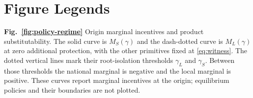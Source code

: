\section*{Figure Legends}

\noindent\textbf{Fig.~\ref{fig:policy-regime}} Origin marginal incentives and product substitutability. The solid curve is $M_S(\gamma)$ and the dash-dotted curve is $M_L(\gamma)$ at zero additional protection, with the other primitives fixed at \eqref{eq:witness}. The dotted vertical lines mark their root-isolation thresholds $\gamma_L$ and $\gamma_S$. Between those thresholds the national marginal is negative and the local marginal is positive. These curves report marginal incentives at the origin; equilibrium policies and their boundaries are not plotted.
